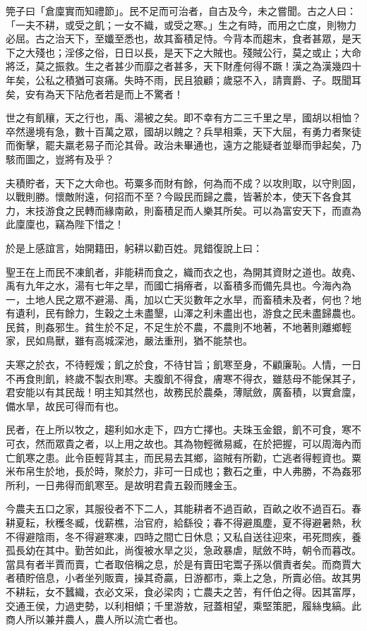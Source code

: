 \begin{pinyinscope}
筦子曰「倉廩實而知禮節」。民不足而可治者，自古及今，未之嘗聞。古之人曰：「一夫不耕，或受之飢；一女不織，或受之寒。」生之有時，而用之亡度，則物力必屈。古之治天下，至孅至悉也，故其畜積足恃。今背本而趨末，食者甚眾，是天下之大殘也；淫侈之俗，日日以長，是天下之大賊也。殘賊公行，莫之或止；大命將泛，莫之振救。生之者甚少而靡之者甚多，天下財產何得不蹶！漢之為漢幾四十年矣，公私之積猶可哀痛。失時不雨，民且狼顧；歲惡不入，請賣爵、子。既聞耳矣，安有為天下阽危者若是而上不驚者！

世之有飢穰，天之行也，禹、湯被之矣。即不幸有方二三千里之旱，國胡以相恤？卒然邊境有急，數十百萬之眾，國胡以餽之？兵旱相乘，天下大屈，有勇力者聚徒而衡擊，罷夫羸老易子而沦其骨。政治未畢通也，遠方之能疑者並舉而爭起矣，乃駭而圖之，豈將有及乎？

夫積貯者，天下之大命也。苟粟多而財有餘，何為而不成？以攻則取，以守則固，以戰則勝。懷敵附遠，何招而不至？今毆民而歸之農，皆著於本，使天下各食其力，末技游食之民轉而緣南畝，則畜積足而人樂其所矣。可以為富安天下，而直為此廩廩也，竊為陛下惜之！

於是上感誼言，始開籍田，躬耕以勸百姓。晁錯復說上曰：

聖王在上而民不凍飢者，非能耕而食之，織而衣之也，為開其資財之道也。故堯、禹有九年之水，湯有七年之旱，而國亡捐瘠者，以畜積多而備先具也。今海內為一，土地人民之眾不避湯、禹，加以亡天災數年之水旱，而畜積未及者，何也？地有遺利，民有餘力，生穀之土未盡墾，山澤之利未盡出也，游食之民未盡歸農也。民貧，則姦邪生。貧生於不足，不足生於不農，不農則不地著，不地著則離鄉輕家，民如鳥獸，雖有高城深池，嚴法重刑，猶不能禁也。

夫寒之於衣，不待輕煖；飢之於食，不待甘旨；飢寒至身，不顧廉恥。人情，一日不再食則飢，終歲不製衣則寒。夫腹飢不得食，膚寒不得衣，雖慈母不能保其子，君安能以有其民哉！明主知其然也，故務民於農桑，薄賦斂，廣畜積，以實倉廩，備水旱，故民可得而有也。

民者，在上所以牧之，趨利如水走下，四方亡擇也。夫珠玉金銀，飢不可食，寒不可衣，然而眾貴之者，以上用之故也。其為物輕微易臧，在於把握，可以周海內而亡飢寒之患。此令臣輕背其主，而民易去其鄉，盜賊有所勸，亡逃者得輕資也。粟米布帛生於地，長於時，聚於力，非可一日成也；數石之重，中人弗勝，不為姦邪所利，一日弗得而飢寒至。是故明君貴五穀而賤金玉。

今農夫五口之家，其服役者不下二人，其能耕者不過百畝，百畝之收不過百石。春耕夏耘，秋穫冬臧，伐薪樵，治官府，給繇役；春不得避風塵，夏不得避暑熱，秋不得避陰雨，冬不得避寒凍，四時之間亡日休息；又私自送往迎來，弔死問疾，養孤長幼在其中。勤苦如此，尚復被水旱之災，急政暴虐，賦斂不時，朝令而暮改。當具有者半賈而賣，亡者取倍稱之息，於是有賣田宅鬻子孫以償責者矣。而商賈大者積貯倍息，小者坐列販賣，操其奇贏，日游都市，乘上之急，所賣必倍。故其男不耕耘，女不蠶織，衣必文采，食必梁肉；亡農夫之苦，有仟伯之得。因其富厚，交通王侯，力過吏勢，以利相傾；千里游敖，冠蓋相望，乘堅策肥，履絲曳縞。此商人所以兼并農人，農人所以流亡者也。


\end{pinyinscope}
